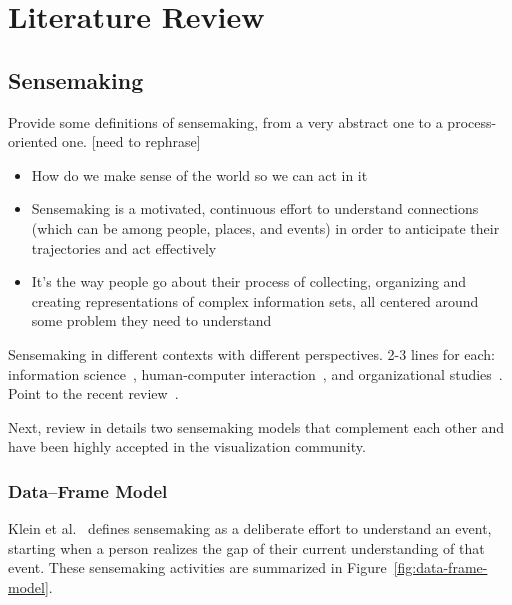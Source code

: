 \chapter{Literature Review}

\graphicspath{{Chapter2/figures/}}

%
%
%
%
%
%

\section{Sensemaking}

Provide some definitions of sensemaking, from a very abstract one to a process-oriented one. [need to  rephrase]
\begin{itemize}
	\item How do we make sense of the world so we can act in it ~\cite{Snowden2005}
	\item Sensemaking is a motivated, continuous effort to understand connections (which can be among people, places, and events) in order to anticipate their trajectories and act effectively ~\cite{Klein2006a}
	\item It's the way people go about their process of collecting, organizing and creating representations of complex information sets, all centered around some problem they need to understand~\cite{Russell2008}
\end{itemize}

Sensemaking in different contexts with different perspectives. 2-3 lines for each:  information science~\cite{Dervin1983}, human-computer interaction~\cite{Russell1993}, and organizational studies~\cite{Weick1995}. Point to the recent review~\cite{Maitlis2014}.

Next, review in details two sensemaking models that complement each other and have been highly accepted in the visualization community.
 
\subsection{Data--Frame Model}
Klein et al.~\cite{Klein2003} defines sensemaking as a deliberate effort to understand an event, starting when a person realizes the gap of their current understanding of that event. These sensemaking activities are summarized in Figure~\ref{fig:data-frame-model}. 

